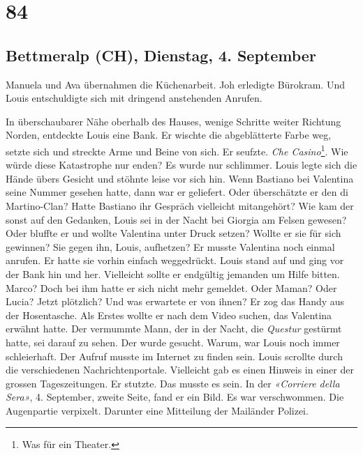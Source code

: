 \chapter{84}

\section{Bettmeralp (CH), Dienstag, 4. 
September}



Manuela und Ava übernahmen die Küchenarbeit. Joh erledigte Bürokram. Und
Louis entschuldigte sich mit dringend anstehenden Anrufen.

\sectionbreak

In überschaubarer Nähe oberhalb des Hauses, wenige Schritte weiter Richtung Norden, entdeckte Louis eine Bank.
Er wischte die abgeblätterte Farbe weg, setzte sich und streckte Arme und Beine von sich.
Er seufzte. \emph{Che Casino}\footnote{Was für ein Theater.}. Wie würde diese Katastrophe nur enden?
Es wurde nur schlimmer.
Louis legte sich die Hände übers Gesicht und stöhnte leise vor sich hin. 
Wenn Bastiano bei Valentina seine Nummer gesehen hatte, dann war er
geliefert. Oder überschätzte er den di Martino-Clan? Hatte Bastiano ihr Gespräch vielleicht mitangehört? Wie kam der sonst auf den Gedanken, Louis sei in der
Nacht bei Giorgia am Felsen gewesen? Oder bluffte er und wollte
Valentina unter Druck setzen? Wollte er sie für sich gewinnen? Sie gegen
ihn, Louis, aufhetzen? Er musste Valentina noch einmal anrufen. Er hatte
sie vorhin einfach weggedrückt.
Louis stand auf und ging vor der Bank hin und her.
Vielleicht sollte er endgültig jemanden um Hilfe bitten. Marco? Doch bei
ihm hatte er sich nicht mehr gemeldet. Oder Maman? Oder Lucia? Jetzt
plötzlich? Und was erwartete er von ihnen?
Er zog das Handy aus der Hosentasche. Als Erstes wollte er nach dem Video suchen,  
das Valentina erwähnt hatte. Der vermummte Mann, der in der
Nacht, die \emph{Questur} gestürmt hatte, sei darauf zu sehen. Der
wurde gesucht. Warum, war Louis noch immer schleierhaft. Der Aufruf
musste im Internet zu finden sein. Louis scrollte durch die
verschiedenen Nachrichtenportale. Vielleicht gab es einen Hinweis in
einer der grossen Tageszeitungen. Er stutzte. Das musste es sein. In
der \emph{«Corriere della Sera»}, 4. September, zweite Seite, fand er ein Bild. Es war verschwommen. Die Augenpartie verpixelt.
Darunter eine Mitteilung der Mailänder Polizei.

\sectionbreak


